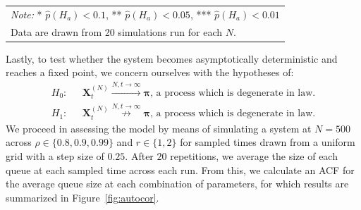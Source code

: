 \begin{table}
\begin{tabular}{|c|c|c|c|}
    \end{tabular}

    \begin{tabular}{p{10cm}}
        \textit{Note:} * $\hat{p}(H_{a}) < 0.1$, ** $\hat{p}(H_{a}) < 0.05$, *** $\hat{p}(H_{a}) < 0.01$
        \\
        Data are drawn from 20 simulations run for each $N$.
    \end{tabular}
\end{table}

Lastly, to test whether the system becomes asymptotically deterministic and reaches a fixed point, we concern ourselves with the hypotheses of:
\begin{align*}
    \label{chi 1}
    H_{0} :& \text{ }\mathbf{X}^{(N)}_{t} \overset{N,t \rightarrow \infty}{\rightarrow} \boldsymbol{\pi} \text{, a process which is degenerate in law.}  \\
    H_{1} :& \text{ }\mathbf{X}^{(N)}_{t} \overset{N,t \rightarrow \infty}{\not \rightarrow} \boldsymbol{\pi} \text{, a process which is degenerate in law.}
\end{align*}
We proceed in assessing the model by means of simulating a system at $N=500$ across $\rho \in \{0.8, 0.9 ,0.99\}$ and $r \in \{1,2\}$ for sampled times drawn from a uniform grid with a step size of $0.25$.
After $20$ repetitions, we average the size of each queue at each sampled time across each run.
From this, we calculate an ACF for the average queue size at each combination of parameters, for which results are summarized in Figure~\ref{fig:autocor}.

